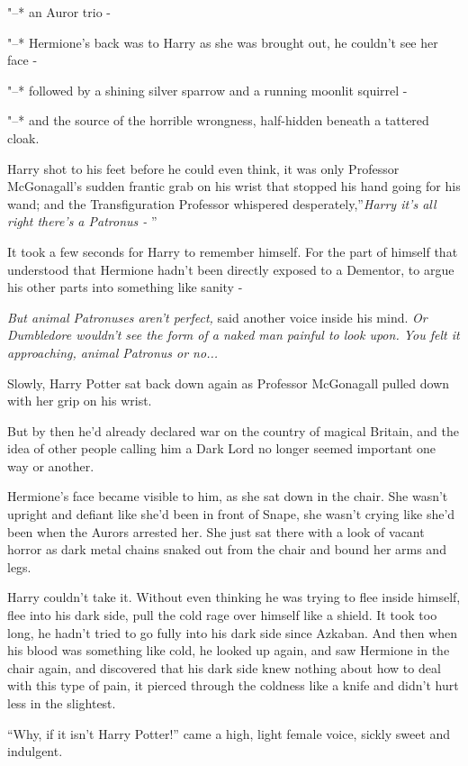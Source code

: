 "--* an Auror trio -

"--* Hermione's back was to Harry as she was brought out, he couldn't see
her face -

"--* followed by a shining silver sparrow and a running moonlit squirrel -

"--* and the source of the horrible wrongness, half-hidden beneath a
tattered cloak.

Harry shot to his feet before he could even think, it was only Professor
McGonagall's sudden frantic grab on his wrist that stopped his hand
going for his wand; and the Transfiguration Professor whispered
desperately,''\emph{Harry it's all right there's a Patronus -} ''

It took a few seconds for Harry to remember himself. For the part of
himself that understood that Hermione hadn't been directly exposed to a
Dementor, to argue his other parts into something like sanity -

\emph{But animal Patronuses aren't perfect,} said another voice inside
his mind. \emph{Or Dumbledore wouldn't see the form of a naked man
painful to look upon. You felt it approaching, animal Patronus or
no...}

Slowly, Harry Potter sat back down again as Professor McGonagall pulled
down with her grip on his wrist.

But by then he'd already declared war on the country of magical Britain,
and the idea of other people calling him a Dark Lord no longer seemed
important one way or another.

Hermione's face became visible to him, as she sat down in the chair. She
wasn't upright and defiant like she'd been in front of Snape, she wasn't
crying like she'd been when the Aurors arrested her. She just sat there
with a look of vacant horror as dark metal chains snaked out from the
chair and bound her arms and legs.

Harry couldn't take it. Without even thinking he was trying to flee
inside himself, flee into his dark side, pull the cold rage over himself
like a shield. It took too long, he hadn't tried to go fully into his
dark side since Azkaban. And then when his blood was something like
cold, he looked up again, and saw Hermione in the chair again, and
discovered that his dark side knew nothing about how to deal with this
type of pain, it pierced through the coldness like a knife and didn't
hurt less in the slightest.

``Why, if it isn't Harry Potter!'' came a high, light female voice,
sickly sweet and indulgent.

